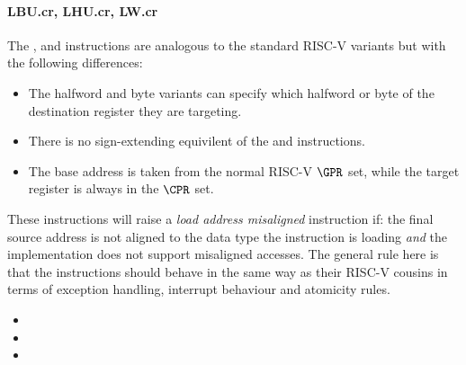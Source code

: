 \paragraph{LBU.cr, LHU.cr, LW.cr}

The ,  and  instructions are analogous to
the standard RISC-V variants but with the following differences:

\begin{itemize}
\item The halfword and byte variants can specify which halfword or byte of
      the destination register they are targeting.
\item There is no sign-extending equivilent of the  and 
      instructions.
\item The base address is taken from the normal RISC-V $\GPR$ set, while the
      target register is always in the $\CPR$ set.
\end{itemize}

These instructions will raise a {\em load address misaligned} instruction
if: the final source address is not aligned to the data type the instruction
is loading {\em and} the implementation does not support misaligned accesses.
The general rule here is that the  instructions should behave in
the same way as their RISC-V cousins in terms of exception handling,
interrupt behaviour and atomicity rules.

\begin{itemize}
\item {}
\item {}
\item {}
\end{itemize}


